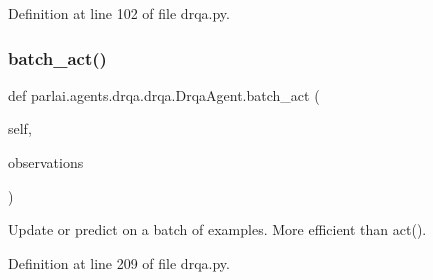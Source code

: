 Definition at line 102 of file drqa.\+py.

\mbox{\label{classparlai_1_1agents_1_1drqa_1_1drqa_1_1DrqaAgent_a5c2f02e9c1ddce46df0d216947227395}} 
\subsubsection{\texorpdfstring{batch\+\_\+act()}{batch\_act()}}
{\footnotesize\ttfamily def parlai.\+agents.\+drqa.\+drqa.\+Drqa\+Agent.\+batch\+\_\+act (\begin{DoxyParamCaption}\item[{}]{self,  }\item[{}]{observations }\end{DoxyParamCaption})}

\begin{DoxyVerb}Update or predict on a batch of examples.
More efficient than act().
\end{DoxyVerb}
 

Definition at line 209 of file drqa.\+py.



